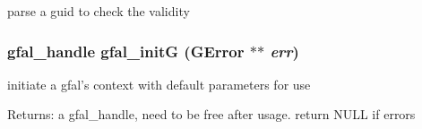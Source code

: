 parse a guid to check the validity 
\subsubsection{\setlength{\rightskip}{0pt plus 5cm}gfal\_\-handle gfal\_\-init\-G (GError $\ast$$\ast$ {\em err})}\label{gfal__common_8h_8410ba458f920d8f8a8f0e5594170fe4}


initiate a gfal's context with default parameters for use \begin{Desc}
\item[Returns:]a gfal\_\-handle, need to be free after usage. return NULL if errors \end{Desc}
